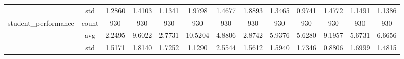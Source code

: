 \begin{table}[htbp]
{\begin{tabular}{rcccccccccccc}
			                                   & std                                    & 1.2860                                                                             & 1.4103                                                                    & 1.1341                                                                    & 1.9798                                                                    & 1.4677                                        & 1.8893                                      & 1.3465                                         & 0.9741                                         & 1.4772                                         & 1.1491                                         & 1.1386                                         \\
			student\_performance               & count                                  & 930                                                                                & 930                                                                       & 930                                                                       & 930                                                                       & 930                                           & 930                                         & 930                                            & 930                                            & 930                                            & 930                                            & 930                                            \\
			                                   & avg                                    & \cellcolor[rgb]{ .776,  .937,  .808}\textcolor[rgb]{ 0,  .38,  0}{2.2495}          & 9.6022                                                                    & 2.7731                                                                    & 10.5204                                                                   & 4.8806                                        & 2.8742                                      & 5.9376                                         & 5.6280                                         & 9.1957                                         & 5.6731                                         & 6.6656                                         \\
			                                   & std                                    & 1.5171                                                                             & 1.8140                                                                    & 1.7252                                                                    & 1.1290                                                                    & 2.5544                                        & 1.5612                                      & 1.5940                                         & 1.7346                                         & 0.8806                                         & 1.6999                                         & 1.4815                                         \\

\end{tabular}}
\end{table}

